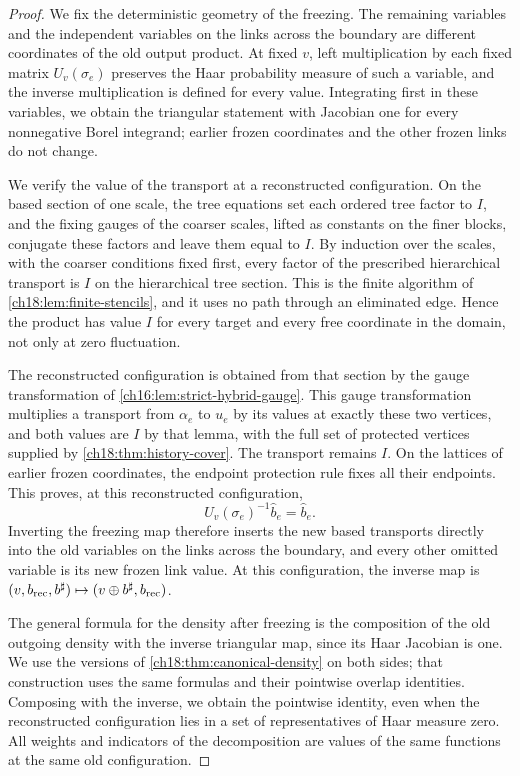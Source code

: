 \begin{proof}
We fix the deterministic geometry of the freezing. The remaining variables and the independent variables on the links across the boundary are different coordinates of the old output product. At fixed $v$, left multiplication by each fixed matrix $U_v(\sigma_e)$ preserves the Haar probability measure of such a variable, and the inverse multiplication is defined for every value. Integrating first in these variables, we obtain the triangular statement with Jacobian one for every nonnegative Borel integrand; earlier frozen coordinates and the other frozen links do not change.

We verify the value of the transport at a reconstructed configuration. On the based section of one scale, the tree equations set each ordered tree factor to $I$, and the fixing gauges of the coarser scales, lifted as constants on the finer blocks, conjugate these factors and leave them equal to $I$. By induction over the scales, with the coarser conditions fixed first, every factor of the prescribed hierarchical transport is $I$ on the hierarchical tree section. This is the finite algorithm of \cref{ch18:lem:finite-stencils}, and it uses no path through an eliminated edge. Hence the product has value $I$ for every target and every free coordinate in the domain, not only at zero fluctuation.

The reconstructed configuration is obtained from that section by the gauge transformation of \cref{ch16:lem:strict-hybrid-gauge}. This gauge transformation multiplies a transport from $\alpha_e$ to $u_e$ by its values at exactly these two vertices, and both values are $I$ by that lemma, with the full set of protected vertices supplied by \cref{ch18:thm:history-cover}. The transport remains $I$. On the lattices of earlier frozen coordinates, the endpoint protection rule fixes all their endpoints. This proves, at this reconstructed configuration,
\[
 U_v(\sigma_e)^{-1}\widehat b_e=\widehat b_e.
\]
Inverting the freezing map therefore inserts the new based transports directly into the old variables on the links across the boundary, and every other omitted variable is its new frozen link value. At this configuration, the inverse map is $(v,b_{\mathrm{rec}},b^\sharp)\mapsto(v\oplus b^\sharp,b_{\mathrm{rec}})$.

The general formula for the density after freezing is the composition of the old outgoing density with the inverse triangular map, since its Haar Jacobian is one. We use the versions of \cref{ch18:thm:canonical-density} on both sides; that construction uses the same formulas and their pointwise overlap identities. Composing with the inverse, we obtain the pointwise identity, even when the reconstructed configuration lies in a set of representatives of Haar measure zero. All weights and indicators of the decomposition are values of the same functions at the same old configuration.


\end{proof}
